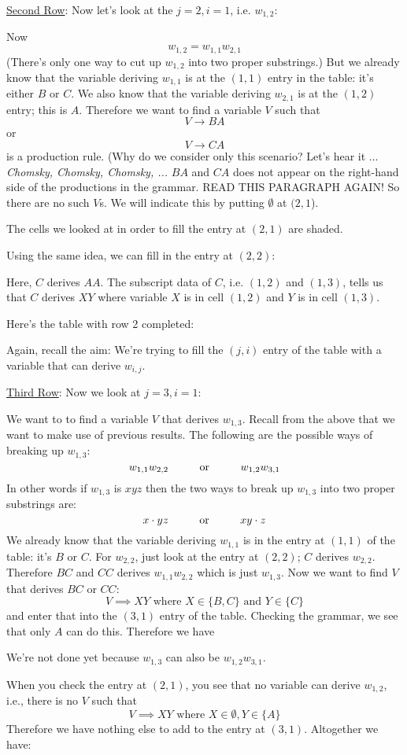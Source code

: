 \underline{Second Row}:
Now let's look at the $j=2, i=1$, i.e. $w_{1, 2}$:

Now
\[
w_{1,2} = w_{1,1} w_{2,1}
\]
(There's only one way to cut up $w_{1,2}$ into two proper substrings.)
But we already know that the variable deriving $w_{1,1}$ is at the $(1,1)$
entry in the table: it's either $B$ or $C$.
We also know that the variable deriving $w_{2,1}$ is at the $(1,2)$ entry;
this is $A$.
Therefore we want to find a variable $V$ such that 
\[
V \rightarrow BA
\]
or
\[
V \rightarrow CA
\]
is a production rule.
(Why do we consider only this scenario? Let's hear it ... 
\textit{ Chomsky, Chomsky, Chomsky, ...}
$BA$ and $CA$ does not appear on the right-hand side of the productions in 
the grammar.
READ THIS PARAGRAPH AGAIN!
So there are no such $V$s.
We will indicate this by putting $\emptyset$ at $(2, 1$).

The cells we looked at in order to fill the entry at $(2,1)$ are shaded.


Using the same idea, we can fill in the entry at $(2,2)$:

Here, $C$ derives $AA$.
The subscript data of $C$, i.e. $(1,2)$ and $(1,3)$, tells us that $C$
derives $XY$ where variable $X$ is in cell $(1,2)$ and
$Y$ is in cell $(1, 3)$.

Here's the table with row 2 completed:


Again, recall the aim: We're trying to fill the $(j,i)$ 
entry of the table with a variable that can derive $w_{i,j}$.

\underline{Third Row}:
Now we look at $j = 3, i = 1$:

We want to to find a variable $V$ that derives $w_{1,3}$.
Recall from the above that we want to make use of previous results.
The following are the possible ways of breaking up $w_{1,3}$:
\[
w_{1,1}w_{2,2} \hskip 1cm \text{or} \hskip 1cm w_{1,2} w_{3,1}
\]
In other words if $w_{1, 3}$ is $xyz$ then the two ways to break up 
$w_{1,3}$ into two proper substrings are:
\[
x \cdot yz \hskip 1cm \text{or} \hskip 1cm  xy \cdot z
\]
We already know that the variable deriving $w_{1,1}$ is in the
entry at $(1,1)$ of the table: it's $B$ or $C$.
For $w_{2,2}$, just look at the entry at $(2,2)$; $C$ derives 
$w_{2,2}$.
Therefore $BC$ and $CC$ derives $w_{1,1}w_{2,2}$ which is just 
$w_{1, 3}$.
Now we want to find $V$ that derives $BC$ or $CC$:
\[
  V \implies XY \text{ where } X \in \{B, C\} \text{ and } Y \in \{C\} 
\]
and enter that
into the $(3,1)$ entry of the table.
Checking the grammar, we see that only $A$ can do this.
Therefore we have

We're not done yet because $w_{1,3}$ can also be $w_{1,2} w_{3,1}$.

When you check the entry at $(2,1)$, you see that no variable can derive $w_{1,2}$, i.e.,
there is no $V$ such that
\[
  V \implies XY \text{ where } X \in \emptyset, Y \in \{A\}
\]
Therefore we have nothing else to add to the entry at $(3,1)$.
Altogether we have:


